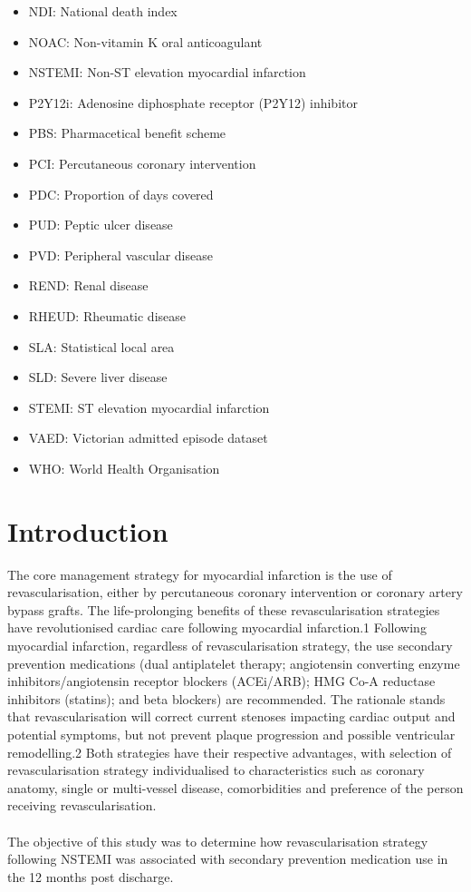 \documentclass[11pt]{article}
\begin{document}
\begin{itemize}
\item NDI: National death index
\item NOAC: Non-vitamin K oral anticoagulant
\item NSTEMI: Non-ST elevation myocardial infarction
\item P2Y12i: Adenosine diphosphate receptor (P2Y12) inhibitor
\item PBS: Pharmacetical benefit scheme
\item PCI: Percutaneous coronary intervention
\item PDC: Proportion of days covered
\item PUD: Peptic ulcer disease
\item PVD: Peripheral vascular disease
\item REND: Renal disease
\item RHEUD: Rheumatic disease
\item SLA: Statistical local area
\item SLD: Severe liver disease
\item STEMI: ST elevation myocardial infarction
\item VAED: Victorian admitted episode dataset
\item WHO: World Health Organisation
\end{itemize}

\pagebreak

\section{Introduction}

The core management strategy for myocardial infarction is the use of revascularisation, either by percutaneous coronary intervention or coronary artery bypass grafts.\cite{accrevasc2022} The life-prolonging benefits of these revascularisation strategies have revolutionised cardiac care following myocardial infarction.1 Following myocardial infarction, regardless of revascularisation strategy, the use secondary prevention medications (dual antiplatelet therapy; angiotensin converting enzyme inhibitors/angiotensin receptor blockers (ACEi/ARB); HMG Co-A reductase inhibitors (statins); and beta blockers) are recommended. The rationale stands that revascularisation will correct current stenoses impacting cardiac output and potential symptoms, but not prevent plaque progression and possible ventricular remodelling.2 Both strategies have their respective advantages, with selection of revascularisation strategy individualised to characteristics such as coronary anatomy, single or multi-vessel disease, comorbidities and preference of the person receiving revascularisation.\cite{accrevasc2022} \\~\\
The objective of this study was to determine how revascularisation strategy following NSTEMI was associated with secondary prevention medication use in the 12 months post discharge.  
\end{document}
